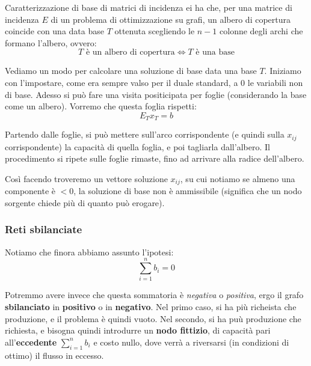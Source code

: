\documentclass[a4paper,11pt]{article}
\begin{document}
\begin{theorem}{Caratterizzazione di base di matrici di incidenza}
	ei ha che, per una matrice di incidenza $E$ di un problema di ottimizzazione su grafi, un albero di copertura coincide con una data base $T$ ottenuta scegliendo le $n-1$ colonne degli archi che formano l'albero, ovvero:
	$$
	T \text{ è un albero di copertura} \Leftrightarrow T \text{ è una base}
	$$
\end{theorem}

Vediamo un modo per calcolare una soluzione di base data una base $T$.
Iniziamo con l'impostare, come era sempre valso per il duale standard, a 0 le variabili non di base.
Adesso si può fare una visita positicipata per foglie (considerando la base come un albero).
Vorremo che questa foglia rispetti:
$$
E_T x_T = b
$$

Partendo dalle foglie, si può mettere sull'arco corrispondente (e quindi sulla $x_{ij}$ corrispondente) la capacità di quella foglia, e poi tagliarla dall'albero.
Il procedimento si ripete sulle foglie rimaste, fino ad arrivare alla radice dell'albero.

Così facendo troveremo un vettore soluzione $x_{ij}$, su cui notiamo se almeno una componente è $< 0$, la soluzione di base non è ammissibile (significa che un nodo sorgente chiede più di quanto può erogare).

\subsubsection{Reti sbilanciate}
Notiamo che finora abbiamo assunto l'ipotesi:
$$
\sum_{i=1}^n b_i = 0
$$

Potremmo avere invece che questa sommatoria è \textit{negativa} o \textit{positiva}, ergo il grafo \textbf{sbilanciato} in \textbf{positivo} o in \textbf{negativo}.
Nel primo caso, si ha più richeista che produzione, e il problema è quindi vuoto.
Nel secondo, si ha puù produzione che richiesta, e bisogna quindi introdurre un \textbf{nodo fittizio}, di capacità pari all'\textbf{eccedente} $\sum_{i=1}^n b_i$ e costo nullo, dove  verrà a riversarsi (in condizioni di ottimo) il flusso in eccesso. 
\end{document}
